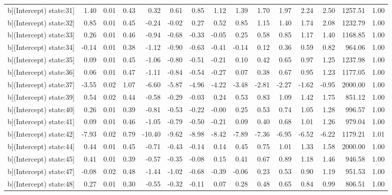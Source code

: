 \begin{table}[ht]
\begin{tabular}{rrrrrrrrrrrrrrr}
  b[(Intercept) state:31] & 1.40 & 0.01 & 0.43 & 0.32 & 0.61 & 0.85 & 1.12 & 1.39 & 1.70 & 1.97 & 2.24 & 2.50 & 1257.51 & 1.00 \\ 
  b[(Intercept) state:32] & 0.85 & 0.01 & 0.45 & -0.24 & -0.02 & 0.27 & 0.52 & 0.85 & 1.15 & 1.40 & 1.74 & 2.08 & 1232.79 & 1.00 \\ 
  b[(Intercept) state:33] & 0.26 & 0.01 & 0.46 & -0.94 & -0.68 & -0.33 & -0.05 & 0.25 & 0.58 & 0.85 & 1.17 & 1.40 & 1168.85 & 1.00 \\ 
  b[(Intercept) state:34] & -0.14 & 0.01 & 0.38 & -1.12 & -0.90 & -0.63 & -0.41 & -0.14 & 0.12 & 0.36 & 0.59 & 0.82 & 964.06 & 1.00 \\ 
  b[(Intercept) state:35] & 0.09 & 0.01 & 0.45 & -1.06 & -0.80 & -0.51 & -0.21 & 0.10 & 0.42 & 0.65 & 0.97 & 1.25 & 1237.98 & 1.00 \\ 
  b[(Intercept) state:36] & 0.06 & 0.01 & 0.47 & -1.11 & -0.84 & -0.54 & -0.27 & 0.07 & 0.38 & 0.67 & 0.95 & 1.23 & 1177.05 & 1.00 \\ 
  b[(Intercept) state:37] & -3.55 & 0.02 & 1.07 & -6.60 & -5.87 & -4.96 & -4.22 & -3.48 & -2.81 & -2.27 & -1.62 & -0.95 & 2000.00 & 1.00 \\ 
  b[(Intercept) state:39] & 0.54 & 0.02 & 0.44 & -0.58 & -0.29 & -0.03 & 0.24 & 0.53 & 0.83 & 1.09 & 1.42 & 1.75 & 851.12 & 1.00 \\ 
  b[(Intercept) state:40] & 0.26 & 0.01 & 0.39 & -0.81 & -0.53 & -0.22 & -0.00 & 0.25 & 0.53 & 0.74 & 1.05 & 1.28 & 996.57 & 1.00 \\ 
  b[(Intercept) state:41] & 0.09 & 0.01 & 0.46 & -1.05 & -0.79 & -0.50 & -0.21 & 0.09 & 0.40 & 0.68 & 1.01 & 1.26 & 979.04 & 1.00 \\ 
  b[(Intercept) state:42] & -7.93 & 0.02 & 0.79 & -10.40 & -9.62 & -8.98 & -8.42 & -7.89 & -7.36 & -6.95 & -6.52 & -6.22 & 1179.21 & 1.01 \\ 
  b[(Intercept) state:44] & 0.44 & 0.01 & 0.45 & -0.71 & -0.43 & -0.14 & 0.14 & 0.45 & 0.75 & 1.01 & 1.33 & 1.58 & 2000.00 & 1.00 \\ 
  b[(Intercept) state:45] & 0.41 & 0.01 & 0.39 & -0.57 & -0.35 & -0.08 & 0.15 & 0.41 & 0.67 & 0.89 & 1.18 & 1.46 & 946.58 & 1.00 \\ 
  b[(Intercept) state:47] & -0.08 & 0.02 & 0.48 & -1.44 & -1.02 & -0.68 & -0.39 & -0.06 & 0.23 & 0.53 & 0.90 & 1.19 & 951.53 & 1.00 \\ 
  b[(Intercept) state:48] & 0.27 & 0.01 & 0.30 & -0.55 & -0.32 & -0.11 & 0.07 & 0.28 & 0.48 & 0.65 & 0.84 & 0.99 & 806.51 & 1.00 \\ 

\end{tabular}
\end{table}
